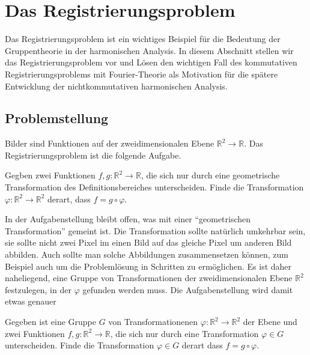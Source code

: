 %
%
%
\section{Das Registrierungsproblem
\label{buch:nichtkomm:section:motivation}}
Das Registrierungsproblem ist ein wichtiges Beispiel für die Bedeutung
der Gruppentheorie in der harmonischen Analysis.
In diesem Abschnitt stellen wir das Registrierungsproblem vor
und Lösen den wichtigen Fall des kommutativen Registrierungsproblems
mit Fourier-Theorie als Motivation für die spätere Entwicklung 
der nichtkommutativen harmonischen Analysis.

%
%
\subsection{Problemstellung
\label{buch:nichtkomm:subsection:problemmstellung}}
Bilder sind Funktionen auf der zweidimensionalen Ebene
$\mathbb{R}^2\to\mathbb{R}$.
Das Registrierungsproblem ist die folgende Aufgabe.

\begin{aufgabe}
Gegben zwei Funktionen $f,g\colon\mathbb{R}^2\to\mathbb{R}$, die
sich nur durch eine geometrische Transformation des Definitionsbereiches 
unterscheiden.
Finde die Transformation $\varphi\colon\mathbb{R}^2\to\mathbb{R}^2$ derart,
dass $f=g\circ \varphi$.
\end{aufgabe}

In der Aufgabenstellung bleibt offen, was mit einer ``geometrischen
Transformation'' gemeint ist.
Die Transformation sollte natürlich umkehrbar sein, sie sollte
nicht zwei Pixel im einen Bild auf das gleiche Pixel um anderen
Bild abbilden.
Auch sollte man solche Abbildungen zusammensetzen können, zum
Beispiel auch um die Problemlösung in Schritten zu ermöglichen.
Es ist daher naheliegend, eine Gruppe von Transformationen
der zweidimensionalen Ebene $\mathbb{R}^2$ festzulegen, in der
$\varphi$ gefunden werden muss.
Die Aufgabenstellung wird damit etwas genauer

\begin{aufgabe}
\label{buch:nichtkomm:aufgabe:regG}
Gegeben ist eine Gruppe $G$ von Transformationenen
$\varphi:\mathbb{R}^2 \to\mathbb{R}^2$ der Ebene und 
zwei Funktionen $f,g\colon\mathbb{R}^2\to\mathbb{R}$, die sich nur durch
eine Transformation $\varphi\in G$ unterscheiden.
Finde die Transformation $\varphi\in G$ derart
dass $f=g\circ \varphi$.
\end{aufgabe}

